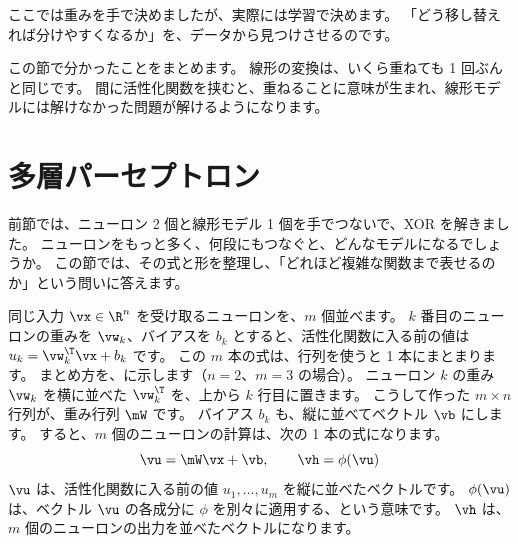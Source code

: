 ここでは重みを手で決めましたが、実際には学習で決めます。
「どう移し替えれば分けやすくなるか」を、データから見つけさせるのです。

この節で分かったことをまとめます。
線形の変換は、いくら重ねても 1 回ぶんと同じです。
間に活性化関数を挟むと、重ねることに意味が生まれ、線形モデルには解けなかった問題が解けるようになります。

\section{多層パーセプトロン}\label{sec:nn-mlp}

前節では、ニューロン 2 個と線形モデル 1 個を手でつないで、XOR を解きました。
ニューロンをもっと多く、何段にもつなぐと、どんなモデルになるでしょうか。
この節では、その式と形を整理し、「どれほど複雑な関数まで表せるのか」という問いに答えます。

同じ入力 $\vx\in\R^{n}$ を受け取るニューロンを、$m$ 個並べます。
$k$ 番目のニューロンの重みを $\vw_k$、バイアスを $b_k$ とすると、活性化関数に入る前の値は $u_k=\vw_k^\T\vx+b_k$ です。
この $m$ 本の式は、行列を使うと 1 本にまとまります。
まとめ方を、に示します（$n=2$、$m=3$ の場合）。
ニューロン $k$ の重み $\vw_k$ を横に並べた $\vw_k^\T$ を、上から $k$ 行目に置きます。
こうして作った $m\times n$ 行列が、重み行列 $\mW$ です。
バイアス $b_k$ も、縦に並べてベクトル $\vb$ にします。
すると、$m$ 個のニューロンの計算は、次の 1 本の式になります。
\begin{equation}
\vu=\mW\vx+\vb,\qquad \vh=\phi(\vu)
\label{eq:nn-layer}
\end{equation}
$\vu$ は、活性化関数に入る前の値 $u_1,\dots,u_m$ を縦に並べたベクトルです。
$\phi(\vu)$ は、ベクトル $\vu$ の各成分に $\phi$ を別々に適用する、という意味です。
$\vh$ は、$m$ 個のニューロンの出力を並べたベクトルになります。

